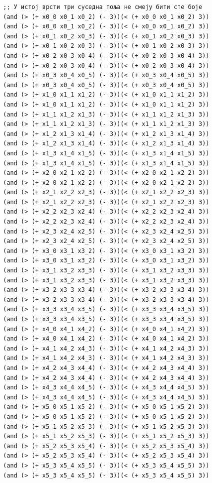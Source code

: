 \documentclass[a4paper]{article}
\begin{document}
\begin{verbatim}
        ;; У истој врсти три суседна поља не смеју бити сте боје
        (and (> (+ x0_0 x0_1 x0_2) (- 3))(< (+ x0_0 x0_1 x0_2) 3))
        (and (> (+ x0_0 x0_1 x0_2) (- 3))(< (+ x0_0 x0_1 x0_2) 3))
        (and (> (+ x0_1 x0_2 x0_3) (- 3))(< (+ x0_1 x0_2 x0_3) 3))
        (and (> (+ x0_1 x0_2 x0_3) (- 3))(< (+ x0_1 x0_2 x0_3) 3))
        (and (> (+ x0_2 x0_3 x0_4) (- 3))(< (+ x0_2 x0_3 x0_4) 3))
        (and (> (+ x0_2 x0_3 x0_4) (- 3))(< (+ x0_2 x0_3 x0_4) 3))
        (and (> (+ x0_3 x0_4 x0_5) (- 3))(< (+ x0_3 x0_4 x0_5) 3))
        (and (> (+ x0_3 x0_4 x0_5) (- 3))(< (+ x0_3 x0_4 x0_5) 3))
        (and (> (+ x1_0 x1_1 x1_2) (- 3))(< (+ x1_0 x1_1 x1_2) 3))
        (and (> (+ x1_0 x1_1 x1_2) (- 3))(< (+ x1_0 x1_1 x1_2) 3))
        (and (> (+ x1_1 x1_2 x1_3) (- 3))(< (+ x1_1 x1_2 x1_3) 3))
        (and (> (+ x1_1 x1_2 x1_3) (- 3))(< (+ x1_1 x1_2 x1_3) 3))
        (and (> (+ x1_2 x1_3 x1_4) (- 3))(< (+ x1_2 x1_3 x1_4) 3))
        (and (> (+ x1_2 x1_3 x1_4) (- 3))(< (+ x1_2 x1_3 x1_4) 3))
        (and (> (+ x1_3 x1_4 x1_5) (- 3))(< (+ x1_3 x1_4 x1_5) 3))
        (and (> (+ x1_3 x1_4 x1_5) (- 3))(< (+ x1_3 x1_4 x1_5) 3))
        (and (> (+ x2_0 x2_1 x2_2) (- 3))(< (+ x2_0 x2_1 x2_2) 3))
        (and (> (+ x2_0 x2_1 x2_2) (- 3))(< (+ x2_0 x2_1 x2_2) 3))
        (and (> (+ x2_1 x2_2 x2_3) (- 3))(< (+ x2_1 x2_2 x2_3) 3))
        (and (> (+ x2_1 x2_2 x2_3) (- 3))(< (+ x2_1 x2_2 x2_3) 3))
        (and (> (+ x2_2 x2_3 x2_4) (- 3))(< (+ x2_2 x2_3 x2_4) 3))
        (and (> (+ x2_2 x2_3 x2_4) (- 3))(< (+ x2_2 x2_3 x2_4) 3))
        (and (> (+ x2_3 x2_4 x2_5) (- 3))(< (+ x2_3 x2_4 x2_5) 3))
        (and (> (+ x2_3 x2_4 x2_5) (- 3))(< (+ x2_3 x2_4 x2_5) 3))
        (and (> (+ x3_0 x3_1 x3_2) (- 3))(< (+ x3_0 x3_1 x3_2) 3))
        (and (> (+ x3_0 x3_1 x3_2) (- 3))(< (+ x3_0 x3_1 x3_2) 3))
        (and (> (+ x3_1 x3_2 x3_3) (- 3))(< (+ x3_1 x3_2 x3_3) 3))
        (and (> (+ x3_1 x3_2 x3_3) (- 3))(< (+ x3_1 x3_2 x3_3) 3))
        (and (> (+ x3_2 x3_3 x3_4) (- 3))(< (+ x3_2 x3_3 x3_4) 3))
        (and (> (+ x3_2 x3_3 x3_4) (- 3))(< (+ x3_2 x3_3 x3_4) 3))
        (and (> (+ x3_3 x3_4 x3_5) (- 3))(< (+ x3_3 x3_4 x3_5) 3))
        (and (> (+ x3_3 x3_4 x3_5) (- 3))(< (+ x3_3 x3_4 x3_5) 3))
        (and (> (+ x4_0 x4_1 x4_2) (- 3))(< (+ x4_0 x4_1 x4_2) 3))
        (and (> (+ x4_0 x4_1 x4_2) (- 3))(< (+ x4_0 x4_1 x4_2) 3))
        (and (> (+ x4_1 x4_2 x4_3) (- 3))(< (+ x4_1 x4_2 x4_3) 3))
        (and (> (+ x4_1 x4_2 x4_3) (- 3))(< (+ x4_1 x4_2 x4_3) 3))
        (and (> (+ x4_2 x4_3 x4_4) (- 3))(< (+ x4_2 x4_3 x4_4) 3))
        (and (> (+ x4_2 x4_3 x4_4) (- 3))(< (+ x4_2 x4_3 x4_4) 3))
        (and (> (+ x4_3 x4_4 x4_5) (- 3))(< (+ x4_3 x4_4 x4_5) 3))
        (and (> (+ x4_3 x4_4 x4_5) (- 3))(< (+ x4_3 x4_4 x4_5) 3))
        (and (> (+ x5_0 x5_1 x5_2) (- 3))(< (+ x5_0 x5_1 x5_2) 3))
        (and (> (+ x5_0 x5_1 x5_2) (- 3))(< (+ x5_0 x5_1 x5_2) 3))
        (and (> (+ x5_1 x5_2 x5_3) (- 3))(< (+ x5_1 x5_2 x5_3) 3))
        (and (> (+ x5_1 x5_2 x5_3) (- 3))(< (+ x5_1 x5_2 x5_3) 3))
        (and (> (+ x5_2 x5_3 x5_4) (- 3))(< (+ x5_2 x5_3 x5_4) 3))
        (and (> (+ x5_2 x5_3 x5_4) (- 3))(< (+ x5_2 x5_3 x5_4) 3))
        (and (> (+ x5_3 x5_4 x5_5) (- 3))(< (+ x5_3 x5_4 x5_5) 3))
        (and (> (+ x5_3 x5_4 x5_5) (- 3))(< (+ x5_3 x5_4 x5_5) 3))


\end{verbatim}
\end{document}

